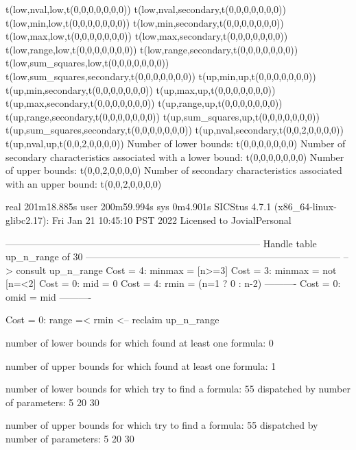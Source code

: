 t(low,nval,low,t(0,0,0,0,0,0,0))
t(low,nval,secondary,t(0,0,0,0,0,0,0))
t(low,min,low,t(0,0,0,0,0,0,0))
t(low,min,secondary,t(0,0,0,0,0,0,0))
t(low,max,low,t(0,0,0,0,0,0,0))
t(low,max,secondary,t(0,0,0,0,0,0,0))
t(low,range,low,t(0,0,0,0,0,0,0))
t(low,range,secondary,t(0,0,0,0,0,0,0))
t(low,sum_squares,low,t(0,0,0,0,0,0,0))
t(low,sum_squares,secondary,t(0,0,0,0,0,0,0))
t(up,min,up,t(0,0,0,0,0,0,0))
t(up,min,secondary,t(0,0,0,0,0,0,0))
t(up,max,up,t(0,0,0,0,0,0,0))
t(up,max,secondary,t(0,0,0,0,0,0,0))
t(up,range,up,t(0,0,0,0,0,0,0))
t(up,range,secondary,t(0,0,0,0,0,0,0))
t(up,sum_squares,up,t(0,0,0,0,0,0,0))
t(up,sum_squares,secondary,t(0,0,0,0,0,0,0))
t(up,nval,secondary,t(0,0,2,0,0,0,0))
t(up,nval,up,t(0,0,2,0,0,0,0))
Number of lower bounds:                                             t(0,0,0,0,0,0,0)
Number of secondary characteristics associated with a lower bound:  t(0,0,0,0,0,0,0)
Number of upper bounds:                                             t(0,0,2,0,0,0,0)
Number of secondary characteristics associated with an upper bound: t(0,0,2,0,0,0,0)

real	201m18.885s
user	200m59.994s
sys	0m4.901s
SICStus 4.7.1 (x86_64-linux-glibc2.17): Fri Jan 21 10:45:10 PST 2022
Licensed to JovialPersonal


--------------------------------------------------------------------------------
Handle table up_n_range of 30
--------------------------------------------------------------------------------
--> consult up_n_range
Cost =  4:  minmax = [n>=3]
Cost =  3:  minmax = not [n=<2]
Cost =  0:  mid    = 0
Cost =  4:  rmin   = (n=1 ? 0 : n-2)
----------
Cost =  0:  omid   = mid
----------

Cost =  0:  range =< rmin
<-- reclaim up_n_range

number of lower bounds for which found at least one formula: 0

number of upper bounds for which found at least one formula: 1

number of lower bounds for which try to find a formula: 55
dispatched by number of parameters: 5  20  30

number of upper bounds for which try to find a formula: 55
dispatched by number of parameters: 5  20  30

